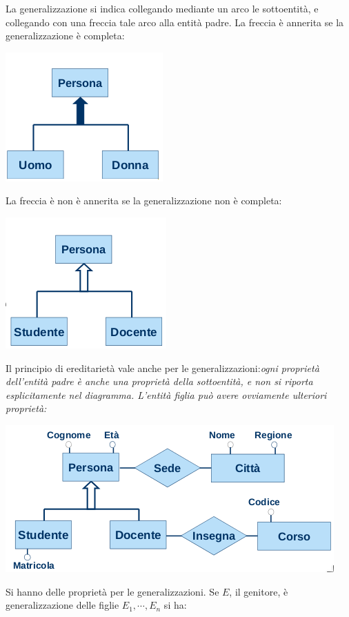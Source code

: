 \documentclass[a4paper,12pt, oneside]{book}
\begin{document}
\newpage
La generalizzazione si indica collegando mediante un arco le
sottoentità, e collegando con una freccia tale arco alla entità padre. La freccia è annerita se la generalizzazione è
completa:
\begin{center}
\includegraphics[scale=2.5]{img/isa2.png}
\end{center}
La freccia è non è annerita se la generalizzazione non è
completa:
\begin{center}
\includegraphics[scale=2.5]{img/isa3.png}
\end{center}
Il principio di ereditarietà vale anche per le generalizzazioni:\textit{ogni proprietà dell'entità padre è anche una proprietà della sottoentità, e non si riporta esplicitamente nel diagramma. L'entità figlia può avere ovviamente ulteriori proprietà:}
\begin{center}
\includegraphics[scale=0.5]{img/isa4.png}
\end{center}
Si hanno delle proprietà per le generalizzazioni. Se $E$, il genitore, è generalizzazione delle figlie $E_1,\cdots, E_n$ si ha:
\end{document}
